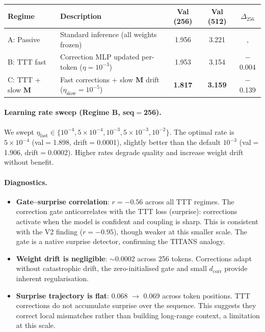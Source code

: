 \documentclass[11pt, a4paper]{article}
\newcommand{\M}{\mathbf{M}}
\theoremstyle{plain}
\theoremstyle{definition}
\theoremstyle{remark}
\begin{document}
\begin{center}\small
\begin{tabular}{llccc}
\toprule
\textbf{Regime} & \textbf{Description} & \textbf{Val (256)} & \textbf{Val (512)} & \textbf{$\Delta_{256}$} \\
\midrule
A: Passive     & Standard inference (all weights frozen)     & 1.956 & 3.221 & ,  \\
B: TTT fast    & Correction MLP updated per-token ($\eta{=}10^{-3}$)  & 1.953 & 3.154 & $-$0.004 \\
C: TTT + slow $\M$ & Fast corrections + slow $\M$ drift ($\eta_{\mathrm{slow}}{=}10^{-5}$) & \textbf{1.817} & \textbf{3.159} & $-$0.139 \\
\bottomrule
\end{tabular}
\end{center}

\paragraph{Learning rate sweep (Regime B, seq$=$256).}
We swept $\eta_{\mathrm{fast}} \in \{10^{-4}, 5{\times}10^{-4}, 10^{-3}, 5{\times}10^{-3}, 10^{-2}\}$.
The optimal rate is $5{\times}10^{-4}$ (val$=$1.898, drift$=$0.0001), slightly better than the default $10^{-3}$ (val$=$1.906, drift$=$0.0002).
Higher rates degrade quality and increase weight drift without benefit.

\paragraph{Diagnostics.}
\begin{itemize}[nosep]
\item \textbf{Gate--surprise correlation}: $r = -0.56$ across all TTT regimes.
      The correction gate anticorrelates with the TTT loss (surprise): corrections activate when the model is confident and coupling is sharp.
      This is consistent with the V2 finding ($r = -0.95$), though weaker at this smaller scale.
      The gate is a native surprise detector, confirming the TITANS analogy.
\item \textbf{Weight drift is negligible}: $\sim$0.0002 across 256 tokens.
      Corrections adapt without catastrophic drift, the zero-initialised gate and small $d_{\mathrm{corr}}$ provide inherent regularisation.
\item \textbf{Surprise trajectory is flat}: 0.068 $\to$ 0.069 across token positions.
      TTT corrections do not accumulate surprise over the sequence.
      This suggests they correct local mismatches rather than building long-range context, a limitation at this scale.
\end{itemize}
\end{document}
